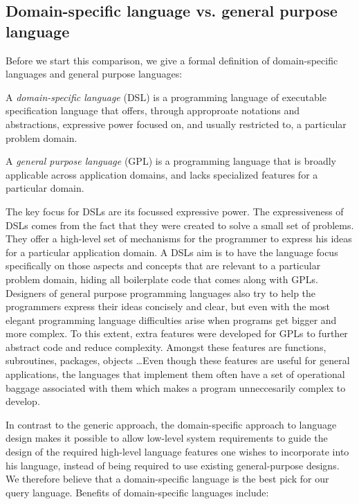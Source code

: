 \subsection{Domain-specific language vs. general purpose language}
\label{subsec:DSLvsGPL}

Before we start this comparison, we give a formal definition of domain-specific languages and general purpose languages:
\begin{definition}
    A \textit{domain-specific language} (DSL) is a programming language of executable specification language that offers, through approproate notations and abstractions, expressive power focused on, and usually restricted to, a particular problem domain.
\end{definition}

\begin{definition}
    A \textit{general purpose language} (GPL) is a programming language that is broadly applicable across application domains, and lacks specialized features for a particular domain.
\end{definition}

The key focus for DSLs are its focussed expressive power. The expressiveness of DSLs comes from the fact that they were created to solve a small set of problems. They offer a high-level set of mechanisms for the programmer to express his ideas for a particular application domain. A DSLs aim is to have the language focus specifically on those aspects and concepts that are relevant to a particular problem domain, hiding all boilerplate code that comes along with GPLs. Designers of general purpose programming languages also try to help the programmers express their ideas concisely and clear, but even with the most elegant programming language difficulties arise when programs get bigger and more complex. To this extent, extra features were developed for GPLs to further abstract code and reduce complexity. Amongst these features are functions, subroutines, packages, objects \dots  Even though these features are useful for general applications, the languages that implement them often have a set of operational baggage associated with them which makes a program unneccesarily complex to develop\cite{FluentInterfacesJava}. 

In contrast to the generic approach, the domain-specific approach to language design makes it possible to allow low-level system requirements to guide the design of the required high-level language features one wishes to incorporate into his language, instead of being required to use existing general-purpose designs.
We therefore believe that a domain-specific language is the best pick for our query language.
Benefits of domain-specific languages include:

